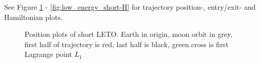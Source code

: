 See Figure \ref{fig:low_energy_short-position} - \ref{fig:low_energy_short-H} for trajectory position-, entry/exit- and Hamiltonian plots.

\begin{figure}[ht!]
    \centering
        \caption{Position plots of short LETO. Earth in origin, moon orbit in grey, first half of trajectory is red, last half is black, green cross is first Lagrange point $L_1$}
        \label{fig:low_energy_short-position}
\end{figure}

